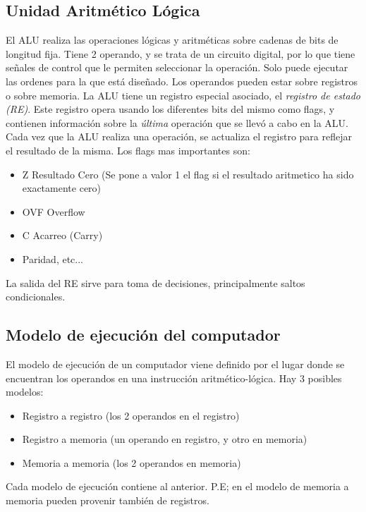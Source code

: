 \documentclass[a4paper,11pt,spanish]{report}
\begin{document}
\subsection{Unidad Aritmético Lógica}
El ALU realiza las operaciones lógicas y aritméticas sobre cadenas de bits de longitud fija. Tiene 2 operando, y se trata de un circuito digital, por lo que tiene señales de control que le permiten seleccionar la operación. Solo puede ejecutar las ordenes para la que está diseñado. Los operandos pueden estar sobre registros o sobre memoria.
La ALU tiene un registro especial asociado, el \emph{registro de estado (RE)}. Este registro opera usando los diferentes bits del mismo como flags, y contienen información sobre la \emph{última} operación que se llevó a cabo en la ALU. Cada vez que la ALU realiza una operación, se actualiza el registro para reflejar el resultado de la misma. Los flags mas importantes son:
\begin{itemize}
\item Z \textrightarrow Resultado Cero (Se pone a valor 1 el flag si el resultado aritmetico ha sido exactamente cero)
\item OVF \textrightarrow Overflow
\item C \textrightarrow Acarreo (Carry)
\item Paridad, etc...
\end{itemize}
La salida del RE sirve para toma de decisiones, principalmente saltos condicionales.
\subsection{Modelo de ejecución del computador}
El modelo de ejecución de un computador viene definido por el lugar donde se encuentran los operandos en una instrucción aritmético-lógica. Hay 3 posibles modelos:
\begin{itemize}
\item Registro a registro (los 2 operandos en el registro)
\item Registro a memoria (un operando en registro, y otro en memoria)
\item Memoria a memoria (los 2 operandos en memoria)
\end{itemize}
Cada modelo de ejecución contiene al anterior. P.E; en el modelo de memoria a memoria pueden provenir también de registros.
\end{document}
